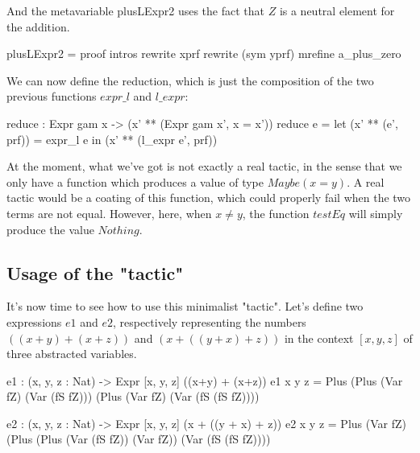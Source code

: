 \documentclass{sigplanconf}
\begin{document}
And the metavariable plusLExpr2 uses the fact that $Z$ is a neutral element for the addition.

\begin{code}[caption=Proof of the metavariable plusLExpr2, captionpos=b, label=lst1:haskell2]
plusLExpr2 = proof
  intros
  rewrite xprf 
  rewrite (sym yprf)
  mrefine a_plus_zero
\end{code}

We can now define the reduction, which is just the composition of the two previous functions $expr\_l$ and $l\_expr$:

\begin{code}[caption=Reduction function, captionpos=b, label=lst1:haskell2]
  reduce : Expr gam x -> 
           (x' ** (Expr gam x', x = x'))
  reduce e = 
     let (x' ** (e', prf)) = expr_l e in
         (x' ** (l_expr e', prf))
\end{code}

At the moment, what we've got is not exactly a real tactic, in the sense that we only have a function which produces a value of type $Maybe (x = y)$. A real tactic would be a coating of this function, which could properly fail when the two terms are not equal. However, here, when $x\ne y$, the function $testEq$ will simply produce the value $Nothing$. \\

\subsection{Usage of the "tactic"}

It's now time to see how to use this minimalist "tactic".
Let's define two expressions $e1$ and $e2$, respectively representing the numbers $((x + y) + (x + z))$ and $(x + ((y + x) + z))$ in the context $[x, y, z]$ of three abstracted variables.

\begin{code}[caption=Two test expressions, captionpos=b, label=lst1:haskell2]
e1 : (x, y, z : Nat) 
    -> Expr [x, y, z] ((x+y) + (x+z))
e1 x y z = Plus (Plus (Var fZ) 
                      (Var (fS fZ))) 
                (Plus (Var fZ) 
                      (Var (fS (fS fZ))))

e2 : (x, y, z : Nat) 
     -> Expr [x, y, z] (x + ((y + x) + z))
e2 x y z = Plus (Var fZ) 
                (Plus (Plus (Var (fS fZ)) 
                            (Var fZ)) 
                      (Var (fS (fS fZ))))
\end{code}
\end{document}
